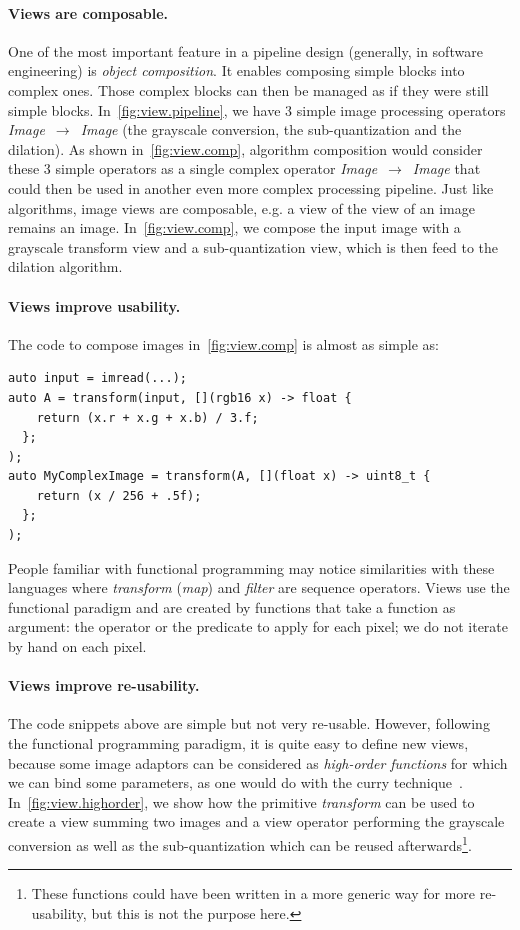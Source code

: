 \paragraph{Views are composable.} One of the most important feature in a pipeline design (generally, in software
engineering) is \emph{object composition}. It enables composing simple blocks into complex ones. Those complex blocks
can then be managed as if they were still simple blocks. In~\cref{fig:view.pipeline}, we have 3 simple image processing
operators \emph{Image}~\(\rightarrow\)~\emph{Image} (the grayscale conversion, the sub-quantization and the dilation).
As shown in~\cref{fig:view.comp}, algorithm composition would consider these 3 simple operators as a single complex
operator \emph{Image}~\(\rightarrow\)~\emph{Image} that could then be used in another even more complex processing
pipeline. Just like algorithms, image views are composable, e.g. a view of the view of an image remains an image.
In~\cref{fig:view.comp}, we compose the input image with a grayscale transform view and a sub-quantization view, which
is then feed to the dilation algorithm.

\paragraph{Views improve usability.} The code to compose images in~\cref{fig:view.comp} is almost as simple as:

\begin{verbatim}
auto input = imread(...);
auto A = transform(input, [](rgb16 x) -> float {
    return (x.r + x.g + x.b) / 3.f;
  };
);
auto MyComplexImage = transform(A, [](float x) -> uint8_t {
    return (x / 256 + .5f);
  };
);
\end{verbatim}

People familiar with functional programming may notice similarities with these languages where \emph{transform}
(\emph{map}) and \emph{filter} are sequence operators. Views use the functional paradigm and are created by functions
that take a function as argument: the operator or the predicate to apply for each pixel; we do not iterate by hand on
each pixel.

\paragraph{Views improve re-usability.} The code snippets above are simple but not very re-usable. However, following
the functional programming paradigm, it is quite easy to define new views, because some image adaptors can be considered
as \emph{high-order functions} for which we can bind some parameters, as one would do with the curry
technique~\parencite{hanus.1995.curry}. In~\cref{fig:view.highorder}, we show how the primitive \emph{transform} can be
used to create a view summing two images and a view operator performing the grayscale conversion as well as the
sub-quantization which can be reused afterwards\footnote{These functions could have been written in a more generic way
  for more re-usability, but this is not the purpose here.}.

